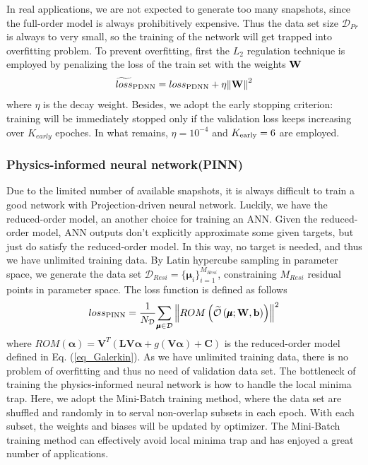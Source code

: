 \documentclass[preprint, 10pt]{elsarticle}
\begin{document}
In real applications, we are not expected to generate too many snapshots, since the full-order model is always prohibitively expensive. Thus the data set size $\mathcal{D}_{Pr}$ is always to very small, so the training of the network will get trapped into overfitting problem. To prevent overfitting, first the $L_2$ regulation technique is employed by penalizing the loss of the train set with the weights $\bf{W}$
\begin{equation}
\widetilde{loss}_{\rm{PDNN}}
 = loss_{\rm{PDNN}}
  + \eta {\left\| { \mathbf{W} } \right\|}^2
\end{equation}
where $\eta$ is the decay weight.
Besides, we adopt the early stopping criterion: training will be immediately stopped only if the validation loss keeps increasing over $K_{early}$ epoches. In what remains, $\eta=10^{-4}$ and $K_{\rm{early}}=6$ are employed.

\subsubsection{Physics-informed neural network(PINN)}
Due to the limited number of available snapshots, it is always difficult to train a good network with Projection-driven neural network. Luckily, we have the reduced-order model, an another choice for training an ANN. Given the reduced-order model, ANN outputs don't explicitly approximate some given targets, but just do satisfy the reduced-order model. In this way, no target is needed, and thus we have unlimited training data. By Latin hypercube sampling in parameter space, we generate the data set $\mathcal{D}_{Resi}=\{ \pmb{\mu}_i\}_{i=1}^{M_{Resi}}$, constraining $M_{Resi}$ residual points in parameter space. The loss function is defined as follows
\begin{equation}
{loss}_{\rm{PINN}} = \frac{1}{N_{\cal D}}
{{\sum\limits_{\pmb\mu  \in {\cal D}}
{ \left\|
ROM \left(\widetilde {\cal O}\left( {\pmb\mu ;{\bf{W}},{\bf{b}}} \right) \right)
\right \|^2}
}}
\end{equation}
where $ROM(\pmb{\alpha})=\mathbf{V}^T
\left(
 \mathbf{L} \mathbf{V} \pmb{\alpha}
+ g         \left( \mathbf{V} \pmb{\alpha} \right)
+\mathbf{C}
\right)$
is the reduced-order model defined in Eq. (\ref{eq_Galerkin}).
As we have unlimited training data, there is no problem of overfitting and thus no need of validation data set.  The bottleneck of training the physics-informed neural network is how to handle the local minima trap. Here, we adopt the Mini-Batch training method, where the data set are shuffled and randomly in to serval non-overlap subsets in each epoch. With each subset, the weights and biases will be updated by optimizer. The Mini-Batch training method can effectively avoid local minima trap and has enjoyed a great number of applications.
\end{document}
